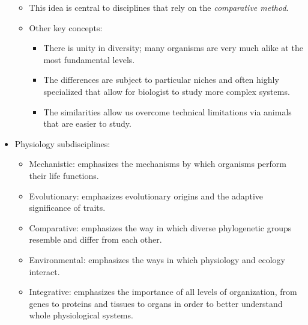\documentclass[12pt,a4paper]{article}
\begin{document}
\begin{itemize}
        \begin{itemize}
            \item This idea is central to disciplines that rely on the \textit{comparative method}.
            \item Other key concepts:
                \begin{itemize}
                    \item There is unity in diversity; many organisms are very much alike at the most fundamental levels. 
                    \item The differences are subject to particular niches and often highly specialized that allow for biologist to study more complex systems.
                    \item The similarities allow us overcome technical limitations via animals that are easier to study.
                \end{itemize}
        \end{itemize}
    \item Physiology subdisciplines: 
        \begin{itemize}
            \item Mechanistic: emphasizes the mechanisms by which organisms perform their life functions.
            \item Evolutionary: emphasizes evolutionary origins and the adaptive significance of traits.
            \item Comparative: emphasizes the way in which diverse phylogenetic groups resemble and differ from each other.
            \item Environmental: emphasizes the ways in which physiology and ecology interact.
            \item Integrative: emphasizes the importance of all levels of organization, from genes to proteins and tissues to organs in order to better understand whole physiological systems.
        \end{itemize}
\end{itemize}
\end{document}
